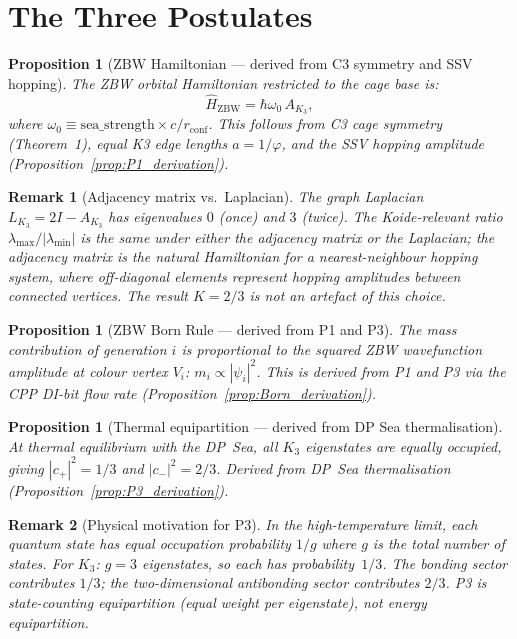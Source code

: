 \documentclass[11pt]{article}
\newtheorem{remark}{Remark}[section]
\newtheorem{proposition}[theorem]{Proposition}
\newcommand{\ZBW}{\mathrm{ZBW}}
\begin{document}
\section{The Three Postulates}

\begin{proposition}[$\ZBW$ Hamiltonian --- derived from C3 symmetry and SSV hopping]
\label{post:H}
The ZBW orbital Hamiltonian restricted to the cage base is:
\[
\hat{H}_{\ZBW} = \hbar\omega_0\, A_{K_3},
\]
where $\omega_0 \equiv \mathrm{sea\_strength}\times c/r_{\mathrm{conf}}$.
This follows from C3 cage symmetry (Theorem~1), equal K3 edge lengths
$a = 1/\varphi$, and the SSV hopping amplitude
(Proposition~\ref{prop:P1_derivation}).
\end{proposition}

\begin{remark}[Adjacency matrix vs.\ Laplacian]
The graph Laplacian $L_{K_3} = 2I - A_{K_3}$ has eigenvalues $0$ (once)
and $3$ (twice).  The Koide-relevant ratio $\lambda_{\max}/|\lambda_{\min}|$
is the same under either the adjacency matrix or the Laplacian; the
adjacency matrix is the natural Hamiltonian for a nearest-neighbour hopping
system, where off-diagonal elements represent hopping amplitudes between
connected vertices.  The result $K = 2/3$ is not an artefact of this choice.
\end{remark}

\begin{proposition}[$\ZBW$ Born Rule --- derived from P1 and P3]
\label{prop:Born}
The mass contribution of generation $i$ is proportional to the squared
ZBW wavefunction amplitude at colour vertex $V_i$:
$m_i \propto |\psi_i|^2$.
This is derived from P1 and P3 via the CPP DI-bit flow rate
(Proposition~\ref{prop:Born_derivation}).
\end{proposition}

\begin{proposition}[Thermal equipartition --- derived from DP Sea thermalisation]
\label{post:equip}
At thermal equilibrium with the DP~Sea, all $K_3$ eigenstates are equally
occupied, giving $|c_+|^2 = 1/3$ and $|c_-|^2 = 2/3$.
Derived from DP~Sea thermalisation
(Proposition~\ref{prop:P3_derivation}).
\end{proposition}

\begin{remark}[Physical motivation for P3]
In the high-temperature limit, each quantum state has equal occupation
probability $1/g$ where $g$ is the total number of states.
For $K_3$: $g = 3$ eigenstates, so each has probability~$1/3$.
The bonding sector contributes $1/3$; the two-dimensional antibonding
sector contributes $2/3$.  P3 is state-counting equipartition (equal
weight per eigenstate), not energy equipartition.
\end{remark}
\end{document}
